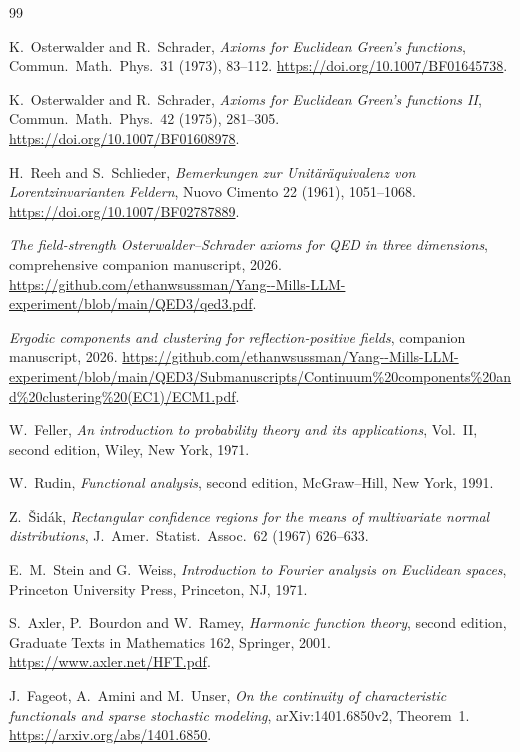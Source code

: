 \documentclass[11pt,letterpaper,reqno]{amsart}
\theoremstyle{definition}
\begin{document}
\begin{thebibliography}{99}

K.~Osterwalder and R.~Schrader,
\emph{Axioms for Euclidean Green's functions},
Commun.\ Math.\ Phys.\ 31 (1973), 83--112.
\url{https://doi.org/10.1007/BF01645738}.

K.~Osterwalder and R.~Schrader,
\emph{Axioms for Euclidean Green's functions II},
Commun.\ Math.\ Phys.\ 42 (1975), 281--305.
\url{https://doi.org/10.1007/BF01608978}.

H.~Reeh and S.~Schlieder,
\emph{Bemerkungen zur Unit\"ar\"aquivalenz von Lorentzinvarianten Feldern},
Nuovo Cimento 22 (1961), 1051--1068.
\url{https://doi.org/10.1007/BF02787889}.

\emph{The field-strength Osterwalder--Schrader axioms for QED in three
dimensions}, comprehensive companion manuscript, 2026.
\url{https://github.com/ethanwsussman/Yang--Mills-LLM-experiment/blob/main/QED3/qed3.pdf}.

\emph{Ergodic components and clustering for reflection-positive fields},
companion manuscript, 2026.
\url{https://github.com/ethanwsussman/Yang--Mills-LLM-experiment/blob/main/QED3/Submanuscripts/Continuum%20components%20and%20clustering%20(EC1)/ECM1.pdf}.

W.~Feller, \emph{An introduction to probability theory and its applications},
Vol.~II, second edition, Wiley, New York, 1971.

W.~Rudin, \emph{Functional analysis}, second edition,
McGraw--Hill, New York, 1991.

Z.~\v{S}id\'ak, \emph{Rectangular confidence regions for the means of multivariate normal distributions}, J.\ Amer.\ Statist.\ Assoc.\ 62 (1967) 626--633.

E.~M.~Stein and G.~Weiss, \emph{Introduction to Fourier analysis on Euclidean spaces},
Princeton University Press, Princeton, NJ, 1971.

S.~Axler, P.~Bourdon and W.~Ramey, \emph{Harmonic function theory},
second edition, Graduate Texts in Mathematics 162, Springer, 2001.
\url{https://www.axler.net/HFT.pdf}.


J.~Fageot, A.~Amini and M.~Unser,
\emph{On the continuity of characteristic functionals and sparse stochastic modeling},
arXiv:1401.6850v2, Theorem~1.
\url{https://arxiv.org/abs/1401.6850}.

\end{thebibliography}
\end{document}
